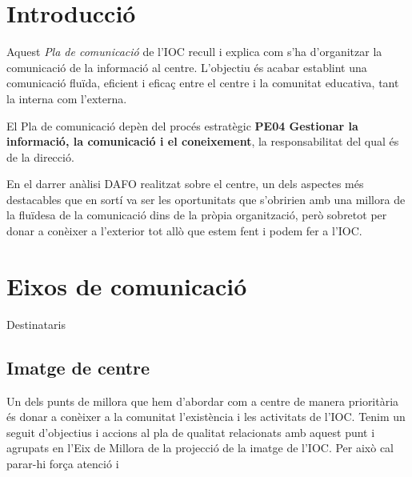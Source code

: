\documentclass[fontsize=10pt,%
paper=a4,%
DIV=14,%
twoside,%
pagesize=auto,%
parskip=half,
captions=tableheading,%
numbers=noenddot,%
toc=graduated%
]{scrartcl}
\begin{document}



\thispagestyle{empty}
\setcounter{tocdepth}{4}
\tableofcontents

\clearpage

\pagestyle{scrheadings}


\section{Introducció}\label{sec:intro}

Aquest \textit{Pla de comunicació} de l'IOC recull i explica com s'ha d'organitzar la comunicació de la informació al centre. L'objectiu és acabar establint una comunicació fluïda, eficient i eficaç entre el centre i la comunitat educativa, tant la interna com l'externa.

El Pla de comunicació depèn del procés estratègic \textbf{PE04 Gestionar la informació, la comunicació i el coneixement}, la responsabilitat del qual és de la direcció.

En el darrer anàlisi DAFO realitzat sobre el centre, un dels aspectes més destacables que en sortí va ser les oportunitats que s'obririen amb una millora de la fluïdesa de la comunicació dins de la pròpia organització, però sobretot per donar a conèixer a l'exterior tot allò que estem fent i podem fer a l'IOC.

\section{Eixos de comunicació}\label{sec:eixos}

Destinataris

\subsection{Imatge de centre}

Un dels punts de millora que hem d'abordar com a centre de manera prioritària és 
donar a conèixer a la comunitat l'existència i les activitats de l'IOC. Tenim un seguit d'objectius i accions al pla de qualitat relacionats amb aquest punt i agrupats en l'Eix de Millora de la projecció de la imatge de l'IOC. Per això cal parar-hi força atenció i 
\end{document}
